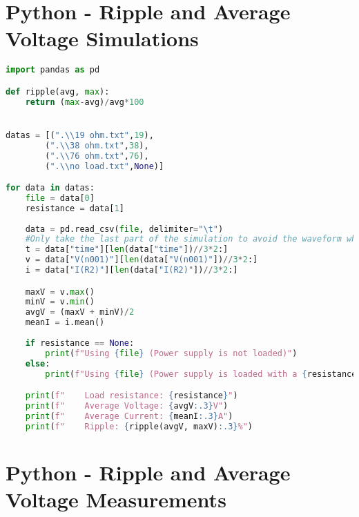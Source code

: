 \section{Python - Ripple and Average Voltage Simulations}
\label{sec:ripvoltcodesim}
\begin{lstlisting}[language=Python]
import pandas as pd

def ripple(avg, max):
    return (max-avg)/avg*100


datas = [(".\\19 ohm.txt",19),
    	(".\\38 ohm.txt",38),
    	(".\\76 ohm.txt",76),
    	(".\\no load.txt",None)]

for data in datas:
    file = data[0]
    resistance = data[1]
    
    data = pd.read_csv(file, delimiter="\t")
    #Only take the last part of the simulation to avoid the waveform when the capacitors are still being loaded
    t = data["time"][len(data["time"])//3*2:]
    v = data["V(n001)"][len(data["V(n001)"])//3*2:]
    i = data["I(R2)"][len(data["I(R2)"])//3*2:]

    maxV = v.max()
    minV = v.min()
    avgV = (maxV + minV)/2
    meanI = i.mean()
    
    if resistance == None:
        print(f"Using {file} (Power supply is not loaded)")
    else:
        print(f"Using {file} (Power supply is loaded with a {resistance} Ohm resistor)")

    print(f"    Load resistance: {resistance}")   
    print(f"    Average Voltage: {avgV:.3}V")
    print(f"    Average Current: {meanI:.3}A")
    print(f"    Ripple: {ripple(avgV, maxV):.3}%")
\end{lstlisting}

\section{Python - Ripple and Average Voltage Measurements}
\label{sec:ripvoltcodemea}

